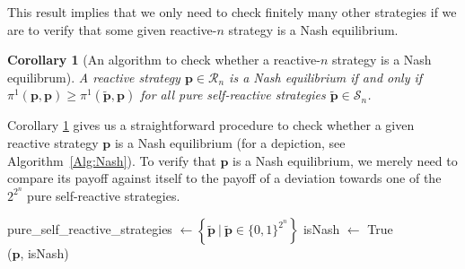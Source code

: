 \documentclass[9pt,twoside,lineno]{pnas-new}
\theoremstyle{plainCl1}
\newtheorem{corollary}{Corollary}
\theoremstyle{plainCl2}
\begin{document}
\noindent
This result implies that we only need to check finitely many other strategies if we are to verify that some given reactive-$n$ strategy is a Nash equilibrium. 

\begin{corollary}[An algorithm to check whether a reactive-$n$ strategy is a Nash equilibrum]
\label{Cor:NashCondition}
A reactive strategy $\mathbf{p}\!\in\!\mathcal{R}_n$ is a Nash equilibrium if and only if $\pi^1(\mathbf{p},\mathbf{p}) \!\ge\! \pi^1(\mathbf{\tilde p},\mathbf{p})$ for all pure self-reactive strategies $\mathbf{\tilde p}\!\in\!\mathcal{S}_n$. 
\end{corollary}

\noindent
Corollary \ref{Cor:NashCondition} gives us a straightforward procedure to check
whether a given reactive strategy $\mathbf{p}$ is a Nash equilibrium (for a
depiction, see Algorithm~\ref{Alg:Nash}). To verify that $\mathbf{p}$ is a Nash
equilibrium, we merely need to compare its payoff against itself to the payoff
of a deviation towards one of the $2^{2^n}$ pure self-reactive strategies.\\

\begin{algorithm}[t!]
      pure\_self\_reactive\_strategies $\gets \left\{ \mathbf{\tilde{p}} ~\big|~ \mathbf{\tilde{p}} \in \{0, 1\}^{2 ^ n} \right\}$ \newline
      \hspace*{-.8em} isNash $\gets$ True \\
      \Return (\(\mathbf{p}\), isNash) \;
  \caption{An algorithm to verify whether a given reactive strategy~$\mathbf{p}$ is a Nash equilibrium.}
  \label{Alg:Nash}
\end{algorithm}


\end{document}
